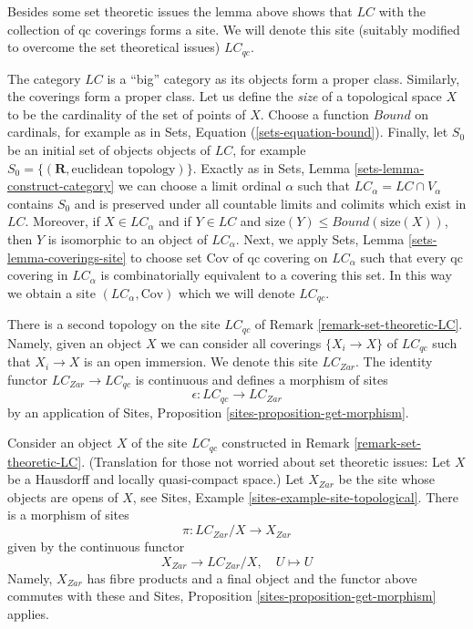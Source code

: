\noindent
Besides some set theoretic issues the lemma above shows that
$\textit{LC}$ with the collection of qc coverings forms a site.
We will denote this site (suitably modified to overcome the
set theoretical issues)
$\textit{LC}_{qc}$.

\begin{remark}
\label{remark-set-theoretic-LC}
The category $\textit{LC}$ is a ``big'' category as its objects form
a proper class. Similarly, the coverings form a proper class.
Let us define the {\it size} of a topological space $X$ to be the
cardinality of the set of points of $X$. Choose a function
$Bound$ on cardinals, for example as in
Sets, Equation (\ref{sets-equation-bound}).
Finally, let $S_0$ be an initial set of objects objects of $\textit{LC}$,
for example $S_0 = \{(\mathbf{R}, \text{euclidean topology})\}$.
Exactly as in Sets, Lemma \ref{sets-lemma-construct-category}
we can choose a limit ordinal $\alpha$ such that
$\textit{LC}_\alpha = \textit{LC} \cap V_\alpha$
contains $S_0$ and is preserved under all countable limits and
colimits which exist in $\textit{LC}$. Moreover, if $X \in \textit{LC}_\alpha$
and if $Y \in \textit{LC}$ and
$\text{size}(Y) \leq Bound(\text{size}(X))$, then $Y$ is isomorphic
to an object of $\textit{LC}_\alpha$.
Next, we apply Sets, Lemma \ref{sets-lemma-coverings-site}
to choose set $\text{Cov}$ of qc covering on $\textit{LC}_\alpha$
such that every qc covering in $\textit{LC}_\alpha$ is
combinatorially equivalent to a covering this set.
In this way we obtain a site $(\textit{LC}_\alpha, \text{Cov})$
which we will denote $\textit{LC}_{qc}$.
\end{remark}

\noindent
There is a second topology on the site $\textit{LC}_{qc}$ of
Remark \ref{remark-set-theoretic-LC}. Namely, given an object
$X$ we can consider all coverings $\{X_i \to X\}$ of $\textit{LC}_{qc}$
such that $X_i \to X$ is an open immersion. We denote this site
$\textit{LC}_{Zar}$. The identity functor
$\textit{LC}_{Zar} \to \textit{LC}_{qc}$ is continuous and defines
a morphism of sites
$$
\epsilon : \textit{LC}_{qc} \to \textit{LC}_{Zar}
$$
by an application of Sites, Proposition \ref{sites-proposition-get-morphism}.

\medskip\noindent
Consider an object $X$ of the site $\textit{LC}_{qc}$ constructed in
Remark \ref{remark-set-theoretic-LC}. (Translation for those not worried
about set theoretic issues: Let $X$ be a Hausdorff and locally quasi-compact
space.) Let $X_{Zar}$ be the site whose objects are opens of $X$, see
Sites, Example \ref{sites-example-site-topological}.
There is a morphism of sites
$$
\pi : \textit{LC}_{Zar}/X \to X_{Zar}
$$
given by the continuous functor
$$
X_{Zar} \longrightarrow \textit{LC}_{Zar}/X,\quad
U \longmapsto U
$$
Namely, $X_{Zar}$ has fibre products and a final object and the
functor above commutes with these and
Sites, Proposition \ref{sites-proposition-get-morphism} applies.

